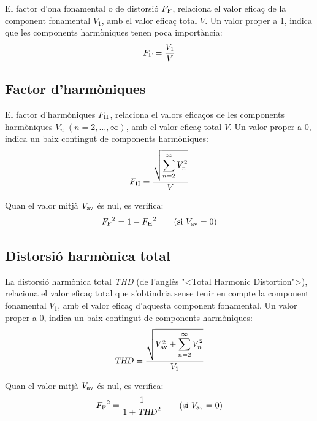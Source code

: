 El factor d'ona fonamental o de distorsi\'{o} $F_\mathrm{F}$, relaciona el
valor efica\c{c} de la component fonamental $V_1$, amb el valor efica\c{c}
total $V$. Un valor proper a 1, indica  que les components
harm\`{o}niques tenen poca import\`{a}ncia:
\begin{equation}
    F_\mathrm{F} = \frac{V_1}{V}
\end{equation}

\subsection{Factor d'harm\`{o}niques}
 

El factor d'harm\`{o}niques $F_\mathrm{H}$, relaciona el valors efica\c{c}os de
les components harm\`{o}niques $V_n \;(n=2,\ldots,\infty)$, amb el valor
efica\c{c} total $V$. Un valor proper a 0, indica un baix contingut de
components harm\`{o}niques:
\begin{equation}
    F_\mathrm{H} = \frac{\sqrt{\displaystyle\sum_{n=2}^\infty V^2_n}}{V}
\end{equation}

Quan el valor mitj\`{a} $V_\mathrm{av}$ \'{e}s nul, es verifica:
\begin{equation}
    {F\ensuremath{_\mathrm{F}}}^2 = 1 - {F_\mathrm{H}}^2 \qquad\text{(si } V_\mathrm{av}=0\text{)}
\end{equation}

\subsection{Distorsi\'{o} harm\`{o}nica total} 

 La distorsi\'{o} harm\`{o}nica total \textsl{THD} (de l'angl\`{e}s {"<}Total
Harmonic Distortion{">}), relaciona el valor efica\c{c} total que
s'obtindria sense tenir en compte  la component fonamental $V_1$,
amb el valor efica\c{c} d'aquesta component fonamental. Un valor proper
a 0, indica un baix contingut de components harm\`{o}niques:
\begin{equation}
    \text{\textsl{THD}} = \frac{\sqrt{V_\mathrm{av}^2+
    \displaystyle\sum_{n=2}^\infty V^2_n}} {V_1}
\end{equation}

Quan el valor mitj\`{a} $V_\mathrm{av}$ \'{e}s nul, es verifica:
\begin{equation}
    {F\ensuremath{_\mathrm{F}}}^2 = \frac{1}{1+\text{\textsl{THD}}^2} \qquad\text{(si } V_\mathrm{av}=0\text{)}
\end{equation}


